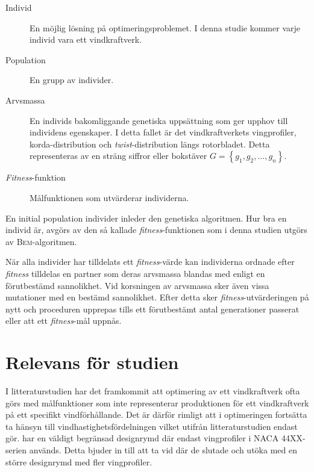 \begin{description}
  \item[Individ] En möjlig lösning på optimeringsproblemet. I denna studie kommer varje individ vara ett vindkraftverk.
  \item[Population] En grupp av individer.
  \item[Arvsmassa] En individs bakomliggande genetiska uppsättning som ger upphov till individens egenskaper. I detta fallet är det vindkraftverkets vingprofiler, korda-distribution och \emph{twist}-distribution längs rotorbladet. Detta representeras av en sträng siffror eller bokstäver $G = \left\{ g_1, g_2, \dots, g_n\right\}$.
  \item[\emph{Fitness}-funktion] Målfunktionen som utvärderar individerna. 
\end{description}

En initial population individer inleder den genetiska algoritmen. Hur bra en individ är, avgörs av den så kallade \emph{fitness}-funktionen som i denna studien utgörs av \textsc{Bem}-algoritmen. 

När alla individer har tilldelats ett \emph{fitness}-värde kan individerna ordnade efter \emph{fitness} tilldelas en partner som deras arvsmassa blandas med enligt en förutbestämd sannolikhet. Vid korsningen av arvsmassa sker även vissa mutationer med en bestämd sannolikhet. Efter detta sker \emph{fitness}-utvärderingen på nytt och proceduren upprepas tills ett förutbestämt antal generationer passerat eller att ett \emph{fitness}-mål uppnås.


\section{Relevans för studien}
I litteraturstudien har det framkommit att optimering av ett vindkraftverk ofta görs med målfunktioner som inte representerar produktionen för ett vindkraftverk på ett specifikt vindförhållande. Det är därför rimligt att i optimeringen fortsätta ta hänsyn till vindhastighetsfördelningen vilket utifrån litteraturstudien  endast \citet{Victoria} gör. \citet{Victoria} har en väldigt begränsad designrymd där endast vingprofiler i NACA 44XX-serien används. Detta bjuder in till att ta vid där de slutade och utöka med en större designrymd med fler vingprofiler.

